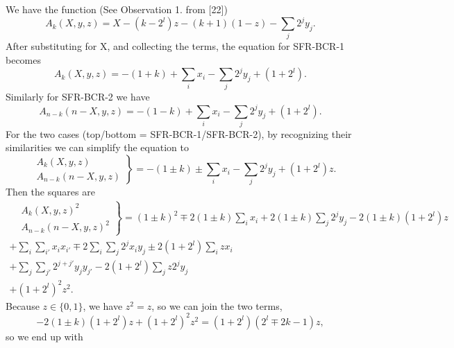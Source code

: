 \documentclass[a4paper,11pt]{article}
\begin{document}
We have the function (See Observation 1. from [22]) %
\begin{equation}
\label{eq:Ak}
A_k(X,y,z) = X - (k-2^l)z - (k+1)(1-z) - \sum_{j}2^jy_j.
\end{equation}
After substituting for X, and collecting the terms, the equation for SFR-BCR-1 becomes
\begin{equation}
\label{eq:Ak1}
A_k(X,y,z) = -(1+k) +\sum_i x_i - \sum_{j}2^jy_j + (1+2^l).
\end{equation}
Similarly for SFR-BCR-2 we have
\begin{equation}
\label{eq:Ak2}
A_{n-k}({n-X},y,z) = -(1-k) +\sum_i x_i - \sum_{j}2^jy_j + (1+2^l).
\end{equation}
For the  two cases
(top/bottom = SFR-BCR-1/SFR-BCR-2),
by recognizing their similarities we can simplify the equation to
\begin{equation}
\label{eq:Ak12}
\left.\begin{aligned}
&A_k(X,y,z) \\
&A_{n-k}({n-X},y,z)
\end{aligned}\right\}
= -(1\pm k) \pm \sum_i x_i - \sum_j 2^jy_j + (1+2^l)z.
\end{equation}
Then the squares are
\begin{equation}
\label{eq:Ak12sq}
\begin{split}
\left.\begin{aligned}
&A_k(X,y,z)^2 \\
&A_{n-k}({n-X},y,z)^2
\end{aligned}\right\}
= (1\pm k)^2 \mp2(1\pm k)\sum_i x_i +2(1\pm k)\sum_j 2^jy_j -2(1\pm k)(1+2^l)z & \\
+ \sum_i\sum_{i'} x_ix_{i'} \mp2\sum_i\sum_j 2^jx_iy_j \pm2 (1+2^l)\sum_i zx_i & \\
+ \sum_j\sum_{j'} 2^{j+j'}y_jy_{j'} - 2(1+2^l)\sum_j z 2^jy_j & \\
+ (1+2^l)^2z^2. &
\end{split}
\end{equation}
Because $z\in\{0,1\}$, we have $z^2=z$, so we can join the two terms,
\begin{equation}
-2(1\pm k)(1+2^l)z + (1+2^l)^2z^2 = (1+2^l)(2^l\mp2k-1)z,
\end{equation}
so we end up with
\end{document}
